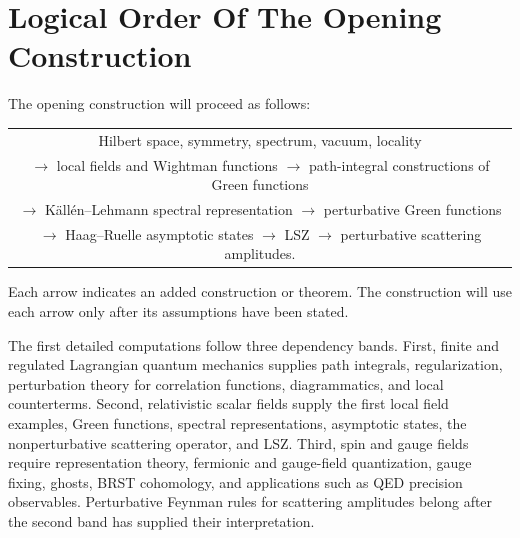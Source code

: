 \section{Logical Order Of The Opening Construction}

The opening construction will proceed as follows:
\begin{center}
\begin{tabular}{c}
Hilbert space, symmetry, spectrum, vacuum, locality\\[2pt]
\(\longrightarrow\) local fields and Wightman functions
\(\longrightarrow\) path-integral constructions of Green functions\\[2pt]
\(\longrightarrow\) K\"all\'en--Lehmann spectral representation
\(\longrightarrow\) perturbative Green functions\\[2pt]
\(\longrightarrow\) Haag--Ruelle asymptotic states
\(\longrightarrow\) LSZ
\(\longrightarrow\) perturbative scattering amplitudes.
\end{tabular}
\end{center}
Each arrow indicates an added construction or theorem. The construction will
use each arrow only after its assumptions have been stated.

The first detailed computations follow three dependency bands.  First, finite
and regulated Lagrangian quantum mechanics supplies path integrals,
regularization, perturbation theory for correlation functions, diagrammatics,
and local counterterms.  Second, relativistic scalar fields supply the first
local field examples, Green functions, spectral representations, asymptotic
states, the nonperturbative scattering operator, and LSZ.  Third, spin and
gauge fields require representation theory, fermionic and gauge-field
quantization, gauge fixing, ghosts, BRST cohomology, and applications such as
QED precision observables.  Perturbative Feynman rules for scattering
amplitudes belong after the second band has supplied their interpretation.
